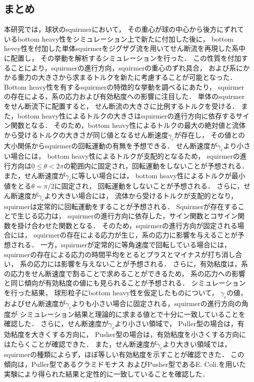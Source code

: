 \subsection{まとめ}
本研究では，球状のsquirmerにおいて，
その重心が球の中心から後方にずれているbottom heavy性をシミュレーション上で新たに付加した後に，
bottom hevey性を付加した単体squirmerをジグザグ流を用いてせん断流を再現した系中に配置し，
その挙動を解析するシミュレーションを行った．
この性質を付加することにより，squirmerの進行方向，squirmerの重心のずれ具合，
および系にかかる重力の大きさから求まるトルクを新たに考慮することが可能となった．
Bottom heavy性を有するsquirmerの特徴的な挙動を調べるにあたり，
squirmerの存在による，系の応力および有効粘度への影響に注目した．
単体のsquirmerをせん断流下に配置すると，
せん断流の大きさに比例するトルクを受ける．
また，bottom heavy性によるトルクの大きさはsquirmerの進行方向に依存するサイン関数となる．
そのため，bottom heavy性によるトルクの最大の絶対値と流体から受けるトルクの大きさが同じ値となるせん断速度$\dot{\gamma}_c$が存在し，
その値との大小関係からsquirmerの回転運動の有無を予想できる．
せん断速度が$\dot{\gamma}_c$より小さい場合には，
bottom heavy性によるトルクが支配的となるため，
squirmerの進行方向は$0 \leq \theta < 2 \pi$の範囲内に固定され，回転運動をしないことが予想される．
また，せん断速度が$\dot{\gamma}_c$に等しい場合には，
bottom heavy性によるトルクが最小値をとる$\theta = \pi / 2$に固定され，
回転運動をしないことが予想される．
さらに，せん断速度が$\dot{\gamma}_c$より大きい場合には，
流体から受けるトルクが支配的となり，
squirmerは定常的に回転運動をすることが予想される．
Squirmerが存在することで生じる応力は，
squirmerの進行方向に依存した，サイン関数とコサイン関数を掛け合わせた関数となる．
そのため，squirmerの進行方向が固定される場合には，
squirmerの存在による応力が生じ，系の応力に影響を与えることが予想される．
一方，squirmerが定常的に等角速度で回転している場合には，
squirmerの存在による応力の時間平均をとるとプラスとマイナスが打ち消し合い，
系の応力には影響を与えないことが予想される．
さらに，有効粘度は，系の応力をせん断速度で割ることで求めることができるため，
系の応力への影響と同じ傾向が有効粘度の値にも見られることが予想される．
シミュレーションを行った結果，
球形粒子にbottom heavy性を仮定したものについて，
$\dot{\gamma}_c$の値，
およびせん断速度が$\dot{\gamma}_c$よりも小さい場合に固定される，squirmerの進行方向の角度が
シミュレーション結果と理論的に求まる値とで十分に一致していることを確認した．
さらに，せん断速度が$\dot{\gamma}_c$より小さい領域で，
Puller型の場合は，有効粘度を大きくする方向に，
Pusher型の場合は，有効粘度を小さくする方向にはたらくことが確認できた．
また，せん断速度が$\dot{\gamma}_c$より大きい領域では，
squirmerの種類によらず，ほぼ等しい有効粘度を示すことが確認できた．
この傾向は，Puller型であるクラミドモナス
およびPusher型であるE. Coli.を用いた実験により得られた結果と定性的に一致していることを確認した．
